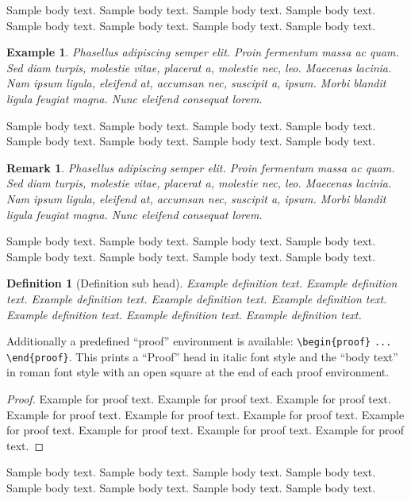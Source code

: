 \documentclass[pdflatex,sn-mathphys-num]{sn-jnl}%
\theoremstyle{thmstyleone}%
\theoremstyle{thmstyletwo}%
\newtheorem{example}{Example}%
\newtheorem{remark}{Remark}%
\theoremstyle{thmstylethree}%
\newtheorem{definition}{Definition}%
\begin{document}
Sample body text. Sample body text. Sample body text. Sample body text. Sample body text. Sample body text. Sample body text. Sample body text.

\begin{example}
Phasellus adipiscing semper elit. Proin fermentum massa
ac quam. Sed diam turpis, molestie vitae, placerat a, molestie nec, leo. Maecenas lacinia. Nam ipsum ligula, eleifend
at, accumsan nec, suscipit a, ipsum. Morbi blandit ligula feugiat magna. Nunc eleifend consequat lorem. 
\end{example}

Sample body text. Sample body text. Sample body text. Sample body text. Sample body text. Sample body text. Sample body text. Sample body text.

\begin{remark}
Phasellus adipiscing semper elit. Proin fermentum massa
ac quam. Sed diam turpis, molestie vitae, placerat a, molestie nec, leo. Maecenas lacinia. Nam ipsum ligula, eleifend
at, accumsan nec, suscipit a, ipsum. Morbi blandit ligula feugiat magna. Nunc eleifend consequat lorem. 
\end{remark}

Sample body text. Sample body text. Sample body text. Sample body text. Sample body text. Sample body text. Sample body text. Sample body text.

\begin{definition}[Definition sub head]
Example definition text. Example definition text. Example definition text. Example definition text. Example definition text. Example definition text. Example definition text. Example definition text. 
\end{definition}

Additionally a predefined ``proof'' environment is available: \verb+\begin{proof}+ \verb+...+ \verb+\end{proof}+. This prints a ``Proof'' head in italic font style and the ``body text'' in roman font style with an open square at the end of each proof environment. 

\begin{proof}
Example for proof text. Example for proof text. Example for proof text. Example for proof text. Example for proof text. Example for proof text. Example for proof text. Example for proof text. Example for proof text. Example for proof text. 
\end{proof}

Sample body text. Sample body text. Sample body text. Sample body text. Sample body text. Sample body text. Sample body text. Sample body text.
\end{document}
